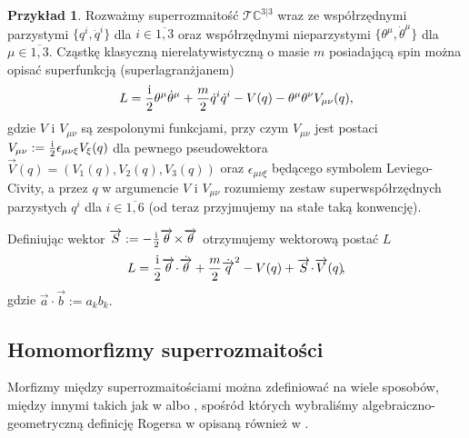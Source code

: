 \documentclass[11pt,a4paper]{report}
\theoremstyle{definition}
\newtheorem{example}[theorem]{Przykład}
\begin{document}
\begin{example}
	\label{ex:casalbuoni}
	Rozważmy superrozmaitość $\mathcal{T} \mathbb{C}^{3|3}$ wraz ze współrzędnymi parzystymi $\{ q^i, \dot{q}^i \}$ dla $i \in \overline{1,3}$ oraz współrzędnymi nieparzystymi $\{ \theta^\mu, \dot{\theta}^\mu \}$ dla $\mu \in \overline{1,3}$. Cząstkę klasyczną nierelatywistyczną o masie $m$ posiadającą spin można opisać \cite{casalbuoni} superfunkcją (superlagranżjanem) 
	\begin{equation}
		L = \frac{\rm i}{2} \theta^\mu \dot{\theta}^\mu + \frac{m}{2} \dot{q}^i \dot{q}^i   - V({q}) - \theta^\mu \theta^\nu V_{\mu \nu} ({q}),
	\end{equation}
	gdzie $V$ i $V_{\mu \nu}$ są zespolonymi funkcjami, przy czym $V_{\mu \nu}$ jest postaci $V_{\mu \nu} := \frac{\rm i}{2} \epsilon_{\mu \nu \xi} V_\xi (q)$ dla pewnego pseudowektora $\overrightarrow{V}(q) = (V_1(q), V_2(q), V_3(q))$ oraz $\epsilon_{\mu \nu \xi}$ będącego symbolem Leviego-Civity, a przez $q$ w argumencie $V$ i $V_{\mu \nu}$ rozumiemy zestaw superwspółrzędnych parzystych $q^i$ dla $i \in \overline{1,6}$ (od teraz przyjmujemy na stałe taką konwencję).
				
	Definiując wektor $\overrightarrow{S} := - \frac{\rm i}{2} \overrightarrow{\theta}\! \times\! \overrightarrow{\theta}$ otrzymujemy wektorową postać $L$
	\begin{equation}
		L = \frac{\rm i}{2} \overrightarrow{\theta}\! \cdot\! \dot{\overrightarrow{\theta}} + \frac{m}{2} \dot{\overrightarrow{q}}^2 - V({q}) + \overrightarrow{S}\! \cdot\! \overrightarrow{V}(q)\!,
	\end{equation}
	gdzie $\overrightarrow{a}\! \cdot\! \overrightarrow{b} := a_k b_k.$
\end{example}

\subsection{Homomorfizmy superrozmaitości}

Morfizmy między superrozmaitościami można zdefiniować na wiele sposobów, między innymi takich jak w \cite{helein} albo \cite{rogers}, spośród których wybraliśmy algebraiczno-geometryczną definicję Rogersa w \cite{rogers} opisaną również w \cite{monterde}.
\end{document}
